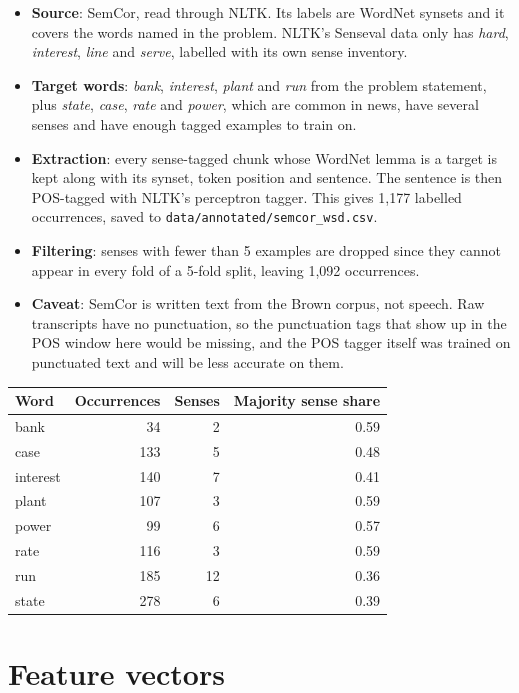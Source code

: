 \documentclass[11pt]{article}
\begin{document}
\begin{itemize}
\item \textbf{Source}: SemCor, read through NLTK. Its labels are WordNet
synsets and it covers the words named in the problem. NLTK's Senseval data only
has \emph{hard}, \emph{interest}, \emph{line} and \emph{serve}, labelled with
its own sense inventory.
\item \textbf{Target words}: \emph{bank}, \emph{interest}, \emph{plant} and
\emph{run} from the problem statement, plus \emph{state}, \emph{case},
\emph{rate} and \emph{power}, which are common in news, have several senses
and have enough tagged examples to train on.
\item \textbf{Extraction}: every sense-tagged chunk whose WordNet lemma is a
target is kept along with its synset, token position and sentence. The sentence
is then POS-tagged with NLTK's perceptron tagger. This gives 1,177 labelled
occurrences, saved to \nolinkurl{data/annotated/semcor_wsd.csv}.
\item \textbf{Filtering}: senses with fewer than 5 examples are dropped since
they cannot appear in every fold of a 5-fold split, leaving 1,092 occurrences.
\item \textbf{Caveat}: SemCor is written text from the Brown corpus, not
speech. Raw transcripts have no punctuation, so the punctuation tags that show
up in the POS window here would be missing, and the POS tagger itself was
trained on punctuated text and will be less accurate on them.
\end{itemize}

\begin{center}
\begin{tabular}{lrrr}
\toprule
Word & Occurrences & Senses & Majority sense share \\
\midrule
bank & 34 & 2 & 0.59 \\
case & 133 & 5 & 0.48 \\
interest & 140 & 7 & 0.41 \\
plant & 107 & 3 & 0.59 \\
power & 99 & 6 & 0.57 \\
rate & 116 & 3 & 0.59 \\
run & 185 & 12 & 0.36 \\
state & 278 & 6 & 0.39 \\
\bottomrule
\end{tabular}
\end{center}

\section{Feature vectors}
\end{document}
